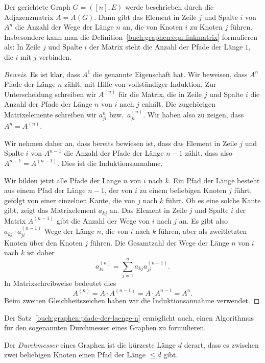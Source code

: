 \begin{satz}
\label{buch:graphen:pfade-der-laenge-n}
Der gerichtete Graph $G=([n],E)$ werde beschrieben durch die Adjazenzmatrix
$A=A(G)$.
Dann gibt das Element in Zeile $j$ und Spalte $i$ von $A^n$ die Anzahl
der Wege der Länge $n$ an, die von Knoten $i$ zu Knoten $j$ führen.
Insbesondere kann man die Definition~\eqref{buch:graphen:eqn:linkmatrix}
formulieren als: In Zeile $j$ und Spalte $i$ der Matrix steht die Anzahl
der Pfade der Länge $1$, die $i$ mit $j$ verbinden.
\end{satz}

\begin{proof}[Beweis]
Es ist klar, dass $A^1$ die genannte Eigenschaft hat.
Wir beweisen, dass $A^n$ Pfade der Länge $n$ zählt, mit Hilfe von
vollständiger Induktion.
Zur Unterscheidung schreiben wir $A^{(n)}$ für die Matrix, die in Zeile
$j$ und Spalte $i$ die Anzahl der Pfade der Länge $n$ von $i$ nach $j$
enhält.
Die zugehörigen Matrixelemente schreiben wir $a_{ji}^{n}$ bzw.~$a_{ji}^{(n)}$.
Wir haben also zu zeigen, dass $A^n = A^{(n)}$.

Wir nehmen daher an, dass bereits bewiesen ist, dass das Element in Zeile
$j$ und Spalte $i$ von $A^{n-1}$ die Anzahl der Pfade der Länge $n-1$
zählt, dass also $A^{n-1}=A^{(n-1)}$.
Dies ist die Induktionsannahme.

Wir bilden jetzt alle Pfade der Länge $n$ von $i$ nach $k$.
Ein Pfad der Länge besteht aus einem Pfad der Länge $n-1$, der von $i$ zu
einem beliebigen Knoten $j$ führt, gefolgt von einer einzelnen Kante,
die von $j$ nach $k$ führt.
Ob es eine solche Kante gibt, zeigt das Matrixelement $a_{kj}$ an.
Das Element in Zeile $j$ und Spalte $i$ der Matrix $A^{(n-1)}$ gibt
die Anzahl der Wege von $i$ nach $j$ an.
Es gibt also $a_{kj}\cdot a_{ji}^{(n-1)}$ Wege der Länge $n$, die von $i$
nach $k$ führen, aber als zweitletzten Knoten über den Knoten $j$ führen.
Die Gesamtzahl der Wege der Länge $n$ von $i$ nach $k$ ist daher
\[
a_{ki}^{(n)}
=
\sum_{j=1}^n a_{kj} a_{ji}^{(n-1)}.
\]
In Matrixschreibweise bedeutet dies
\[
A^{(n)}
=
A\cdot A^{(n-1)}
=
A\cdot A^{n-1}
=
A^n.
\]
Beim zweiten Gleichheitszeichen haben wir die Induktionsannahme
verwendet.
\end{proof}

Der Satz~\ref{buch:graphen:pfade-der-laenge-n} ermöglicht auch, einen 
Algorithmus für den sogenannten Durchmesser eines Graphen zu formulieren.

\begin{definition}
%
%
Der {\em Durchmesser} eines Graphen ist die kürzeste Länge $d$ derart, dass
es zwischen zwei beliebigen Knoten einen Pfad der Länge $\le d$ gibt.
\end{definition}

